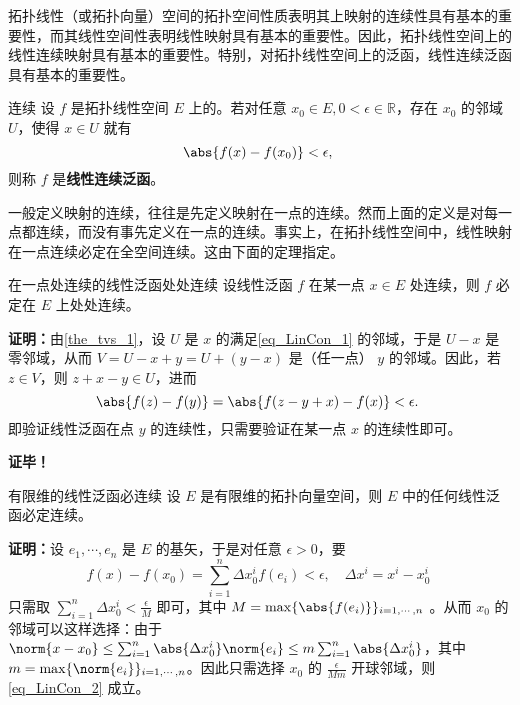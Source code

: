 
拓扑线性（或拓扑向量）空间的拓扑空间性质表明其上映射的连续性具有基本的重要性，而其线性空间性表明线性映射具有基本的重要性。因此，拓扑线性空间上的线性连续映射具有基本的重要性。特别，对拓扑线性空间上的泛函，线性连续泛函具有基本的重要性。
\begin{definition}{连续}
设 $f$ 是拓扑线性空间 $E$ 上的。若对任意 $x_0\in E,0<\epsilon\in\mathbb R$，存在 $x_0$ 的邻域 $U$，使得 $x\in U$ 就有
\begin{equation}\label{eq_LinCon_1}
\abs{f(x)-f(x_0)}<\epsilon,~
\end{equation}
则称 $f$ 是\textbf{线性连续泛函}。
\end{definition}

一般定义映射的连续，往往是先定义映射在一点的连续。然而上面的定义是对每一点都连续，而没有事先定义在一点的连续。事实上，在拓扑线性空间中，线性映射在一点连续必定在全空间连续。这由下面的定理指定。
\begin{theorem}{在一点处连续的线性泛函处处连续}\label{the_LinCon_1}
设线性泛函 $f$ 在某一点 $x\in E$ 处连续，则 $f$ 必定在 $E$ 上处处连续。
\end{theorem}
\textbf{证明：}由\autoref{the_tvs_1}，设 $U$ 是 $x$ 的满足\autoref{eq_LinCon_1} 的邻域，于是 $U-x$ 是零邻域，从而 $V=U-x+y=U+(y-x)$ 是（任一点） $y$ 的邻域。因此，若 $z\in V$，则 $z+x-y\in U$，进而
\begin{equation}
\abs{f(z)-f(y)}=\abs{f(z-y+x)-f(x)}<\epsilon.~
\end{equation}
即验证线性泛函在点 $y$ 的连续性，只需要验证在某一点 $x$ 的连续性即可。

\textbf{证毕！}

\begin{theorem}{有限维的线性泛函必连续}
设 $E$ 是有限维的拓扑向量空间，则 $E$ 中的任何线性泛函必定连续。
\end{theorem}
\textbf{证明：}设 $e_1,\cdots,e_n$ 是 $E$ 的基矢，于是对任意 $\epsilon>0$，要
\begin{equation}\label{eq_LinCon_2}
f(x)-f(x_0)=\sum_{i=1}^n\Delta x_0^i f(e_i)<\epsilon,\quad\Delta x^i=x^i-x^i_0~
\end{equation}
 只需取 $\sum_{i=1}^n\Delta x_0^i<\frac{\epsilon}{M}$ 即可，其中 $M=\max\{\abs{f(e_i)}\}_{i=1,\cdots,n}$ 。从而 $x_0$ 的邻域可以这样选择：由于 $\norm{x-x_0}\leq\sum_{i=1}^n\abs{\Delta x_0^i}\norm{e_i}\leq m\sum_{i=1}^n\abs{\Delta x_0^i}$，其中 $m=\max\{\norm{e_i}\}_{i=1,\cdots,n}$。因此只需选择 $x_0$ 的 $\frac{\epsilon}{Mm}$ 开球邻域，则\autoref{eq_LinCon_2} 成立。

